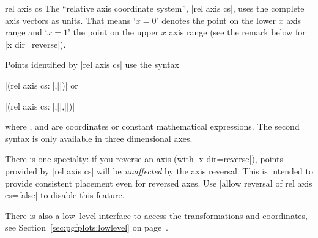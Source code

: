 \begin{coordinatesystem}{rel axis cs}
The ``relative axis coordinate system'', |rel axis cs|, uses the complete axis vectors as units. That means `$x=0$' denotes the point on the lower $x$ axis range and `$x=1$' the point on the upper $x$ axis range (see the remark below for |x dir=reverse|).

\pgfplotsexpensiveexample
\begin{codeexample}[]
\end{codeexample}

\pgfplotsexpensiveexample
\begin{codeexample}[]
\end{codeexample}

	Points identified by |rel axis cs| use the syntax

		|(rel axis cs:||,||)| or

		|(rel axis cs:||,||,||)| 
	
	\noindent where ,  and  are coordinates or constant mathematical expressions. The second syntax is only available in three dimensional axes.

	There is one specialty: if you reverse an axis (with |x dir=reverse|), points provided by |rel axis cs| will be \emph{unaffected} by the axis reversal. This is intended to provide consistent placement even for reversed axes. Use |allow reversal of rel axis cs=false| to disable this feature.

There is also a low--level interface to access the transformations and coordinates, see Section~\ref{sec:pgfplots:lowlevel} on page~\pageref{sec:pgfplots:lowlevel}.
\end{coordinatesystem}

